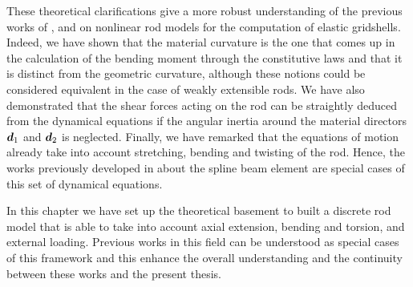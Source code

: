 These theoretical clarifications give a more robust understanding of the previous works of ,  and  on nonlinear rod models for the computation of elastic gridshells. Indeed, we have shown that the material curvature is the one that comes up in the calculation of the bending moment through the constitutive laws and that it is distinct from the geometric curvature, although these notions could be considered equivalent in the case of weakly extensible rods. We have also demonstrated that the shear forces acting on the rod can be straightly deduced from the dynamical equations if the angular inertia around the material directors $\boldsymbol{d}_1$ and $\boldsymbol{d}_2$ is neglected. Finally, we have remarked that the equations of motion already take into account stretching, bending and twisting of the rod. Hence, the works previously developed in \cite{Adriaenssens1999,Douthe2007} about the  spline beam element are special cases of this set of dynamical equations.

In this chapter we have set up the theoretical basement to built a discrete rod model that is able to take into account axial extension, bending and torsion, and external loading. Previous works in this field can be understood as special cases of this framework and this enhance the overall understanding and the continuity between these works and the present thesis.

%
%
